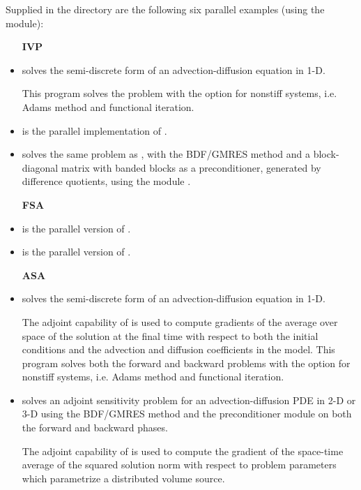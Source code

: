 \vspace{0.2in}
\noindent Supplied in the  directory are
the following six parallel examples (using the {\nvecp} module):
\begin{itemize}

\item[{\bf IVP}]

\item {}
  solves the semi-discrete form of an advection-diffusion equation in 1-D.

  This program solves the problem with the option for nonstiff systems,
  i.e. Adams method and functional iteration.

\item {}
  is the parallel implementation of .

\item {}
  solves the same problem as , with the BDF/GMRES method 
  and a block-diagonal matrix with banded blocks as a preconditioner, 
  generated by difference quotients, using the module {\cvbbdpre}.

\item[{\bf FSA}]

\item {}
  is the parallel version of .

\item {}
  is the parallel version of .

\item[{\bf ASA}]

\item {}
  solves the semi-discrete form of an advection-diffusion equation in 1-D.

  The adjoint capability of {\cvodes} is used to compute gradients
  of the average over space of the solution at the final time with
  respect to both the initial conditions and the advection and
  diffusion coefficients in the model.
  This program solves both the forward and backward problems with the option 
  for nonstiff systems, i.e. Adams method and functional iteration.

\item {}
  solves an adjoint sensitivity problem for an advection-diffusion PDE in 2-D 
  or 3-D using the BDF/GMRES method and the {\cvbbdpre} preconditioner module
  on both the forward and backward phases.

  The adjoint capability of {\cvodes} is used to compute the gradient of the
  space-time average of the squared solution norm with respect to problem 
  parameters which parametrize a distributed volume source.

\end{itemize}

